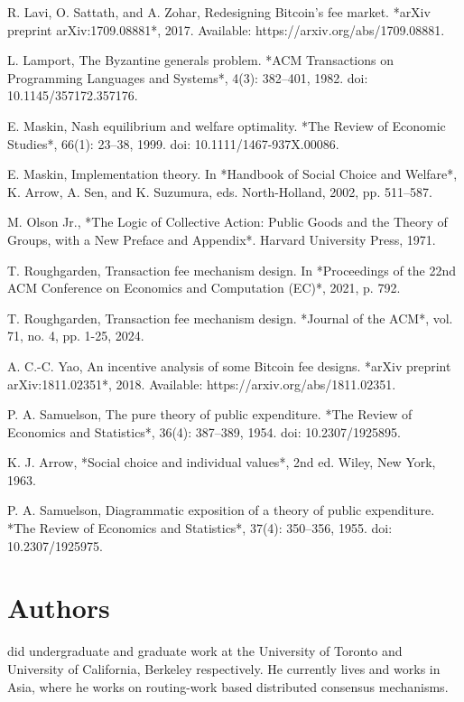 \documentclass[11pt,a4paper]{llncs}
\begin{document}
\begin{thebibliography}{4}
R. Lavi, O. Sattath, and A. Zohar, Redesigning Bitcoin’s fee market. *arXiv preprint arXiv:1709.08881*, 2017. Available: https://arxiv.org/abs/1709.08881.

L. Lamport, The Byzantine generals problem. *ACM Transactions on Programming Languages and Systems*, 4(3): 382--401, 1982. doi: 10.1145/357172.357176.

E. Maskin, Nash equilibrium and welfare optimality. *The Review of Economic Studies*, 66(1): 23--38, 1999. doi: 10.1111/1467-937X.00086.

E. Maskin, Implementation theory. In *Handbook of Social Choice and Welfare*, K. Arrow, A. Sen, and K. Suzumura, eds. North-Holland, 2002, pp. 511--587.

M. Olson Jr., *The Logic of Collective Action: Public Goods and the Theory of Groups, with a New Preface and Appendix*. Harvard University Press, 1971.

T. Roughgarden, Transaction fee mechanism design. In *Proceedings of the 22nd ACM Conference on Economics and Computation (EC)*, 2021, p. 792.

T. Roughgarden, Transaction fee mechanism design. *Journal of the ACM*, vol. 71, no. 4, pp. 1-25, 2024.

A. C.-C. Yao, An incentive analysis of some Bitcoin fee designs. *arXiv preprint arXiv:1811.02351*, 2018. Available: https://arxiv.org/abs/1811.02351.

P. A. Samuelson, The pure theory of public expenditure. *The Review of Economics and Statistics*, 36(4): 387--389, 1954. doi: 10.2307/1925895.

K. J. Arrow, *Social choice and individual values*, 2nd ed. Wiley, New York, 1963.

P. A. Samuelson, Diagrammatic exposition of a theory of public expenditure. *The Review of Economics and Statistics*, 37(4): 350--356, 1955. doi: 10.2307/1925975.

\end{thebibliography}

\vspace{2cm}

\section*{Authors}
 did undergraduate and graduate work at the University of Toronto and University of California, Berkeley respectively. He currently lives and works in Asia, where he works on routing-work based distributed consensus mechanisms.
\end{document}
